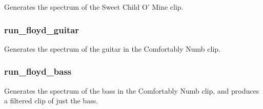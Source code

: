 Generates the spectrum of the Sweet Child O' Mine clip.

\subsubsection{run\_floyd\_guitar}

\begin{Shaded}
\begin{Highlighting}[]
\end{Highlighting}
\end{Shaded}

Generates the spectrum of the guitar in the Comfortably Numb clip.

\subsubsection{run\_floyd\_bass}

\begin{Shaded}
\begin{Highlighting}[]
\end{Highlighting}
\end{Shaded}

Generates the spectrum of the bass in the Comfortably Numb clip, and
produces a filtered clip of just the bass.
